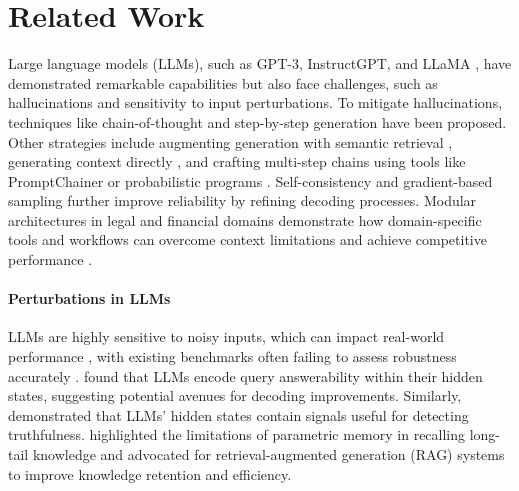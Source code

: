 \section{Related Work}
Large language models (LLMs), such as GPT-3, InstructGPT, and LLaMA \citep{NEURIPS2020_1457c0d6, ouyang2022training, touvron2023llama}, have demonstrated remarkable capabilities but also face challenges, such as hallucinations and sensitivity to input perturbations. To mitigate hallucinations, techniques like chain-of-thought \citep{wei2023chainofthought} and step-by-step generation \citep{nye2021work} have been proposed. Other strategies include augmenting generation with semantic retrieval \citep{liu2021makes,reimers-2019-sentence-bert}, generating context directly \citep{yu2023generate}, and crafting multi-step chains using tools like PromptChainer \citep{10.1145/3491101.3519729} or probabilistic programs \citep{dohan2022language}. Self-consistency \citep{wang2023selfconsistency} and gradient-based sampling \citep{kumar-etal-2022-gradient} further improve reliability by refining decoding processes. Modular architectures in legal and financial domains demonstrate how domain-specific tools and workflows can overcome context limitations and achieve competitive performance \citep{watson-etal-2025-law, 10.1145/3677052.3698597, 10.1145/3604237.3626908, watson-etal-2023-hiddentables}.

\paragraph{Perturbations in LLMs}
LLMs are highly sensitive to noisy inputs, which can impact real-world performance \citep{zhang2022interpretingrobustnessneuralnlp}, with existing benchmarks often failing to assess robustness accurately \citep{moradi2021evaluatingrobustnessneurallanguage}. \citet{slobodkin-etal-2023-curious} found that LLMs encode query answerability within their hidden states, suggesting potential avenues for decoding improvements. Similarly, \citet{azaria2023internalstatellmknows} demonstrated that LLMs' hidden states contain signals useful for detecting truthfulness. \citet{mallen-etal-2023-trust} highlighted the limitations of parametric memory in recalling long-tail knowledge and advocated for retrieval-augmented generation (RAG) systems to improve knowledge retention and efficiency.


